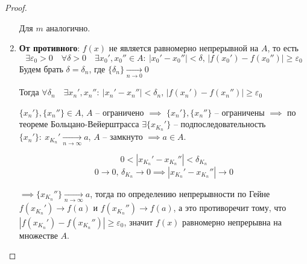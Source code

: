 \documentclass[a4paper,oneside]{article}
\newcommand{\eps}{\varepsilon}
\newcommand{\approach}[1]{\underset{#1}{\longrightarrow}}
\theoremstyle{definition}
\theoremstyle{definition}
\theoremstyle{definition}
\begin{document}
\begin{proof}
\begin{enumerate}
            Для $m$ аналогично.

        \item
            \textbf{От противного}: $f(x)$ не является равномерно непрерывной на $A$, то есть
            \[ 
                \exists \eps_0 > 0 \quad \forall \delta > 0 \quad \exists x_0', x_0'' \in A: \: | x_0' - x_0'' | < \delta,
                \, | f(x_0') - f(x_0'') | \ge \eps_0
            \]
            Будем брать $\delta = \delta_n$, где $\{ \delta_n \} \approach{n \to 0} 0$

            Тогда $\forall \delta_n \quad \exists x_n', x_n'': \: |x_n' - x_n''| < \delta_n, \, |f(x_n') - f(x_n'')| \ge \eps_0$

            $\{x_n'\}, \{x_n''\} \in A$, $A$ -- ограничено $\implies$ $\{x_n'\}, \{x_n''\}$ -- ограничены
            $\implies$ по теореме Больцано-Вейерштрасса $\exists \{x_{K_n}'\}$ -- подпоследовательность
            $\{x_n'\}: \: x_{K_n}' \approach{n \to \infty} a$, $A$ -- замкнуто $\implies a \in A$.

            \[ 0 < |x_{K_n}' - x_{K_n}''| < \delta_{K_n} \]
            \[ 0 \approach{} 0, \, \delta_{K_n} \approach{} 0 \implies |x_{K_n}' - x_{K_n}''| \approach{} 0 \]
            
            $\implies \{x_{K_n}''\} \approach{n \to \infty} a$, тогда по определению непрерывности по Гейне
            $f(x_{K_n}') \approach{} f(a)$ и $f(x_{K_n}'') \approach{} f(a)$, а это противоречит тому, что
            $|f(x_{K_n}') - f(x_{K_n}'')| \ge \eps_0$, значит $f(x)$ равномерно непрерывна на множестве $A$.
    \end{enumerate}
\end{proof}
\end{document}
